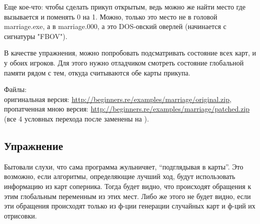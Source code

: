 Еще кое-что: чтобы сделать прикуп открытым, ведь можно же найти место где вызывается  и поменять 0
на 1. Можно, только это место не в головой marriage.exe, а в marriage.000, а это DOS-овский оверлей (начинается
с сигнатуры "FBOV").

В качестве упражнения, можно попробовать подсматривать состояние всех карт, и у обоих игроков.
Для этого нужно отладчиком смотреть состояние глобальной памяти рядом с тем, откуда считываются обе карты
прикупа.

Файлы: \\
оригинальная версия: \url{http://beginners.re/examples/marriage/original.zip}, \\
пропатченная мною версия: \url{http://beginners.re/examples/marriage/patched.zip} 
(все 4 условных перехода после  заменены на \JMP).

\subsection{Упражнение}

Бытовали слухи, что сама программа жульничяет, ``подглядывая в карты''.
Это возможно, если алгоритмы, определяющие лучший ход, будут использовать информацию из карт соперника.
Тогда будет видно, что происходят обращения к этим глобальным переменным из этих мест.
Либо же этого не будет видно, если эти обращения происходят только из ф-ции генерации случайных карт
и ф-ций их отрисовки.

